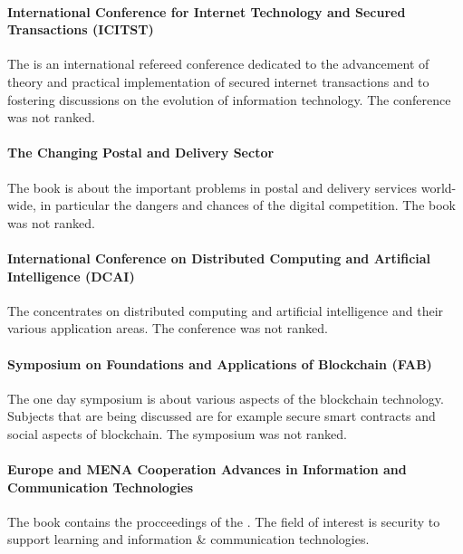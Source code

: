 \paragraph{International Conference for Internet Technology and Secured Transactions (ICITST)} The  is an international refereed conference dedicated to the advancement of theory and practical implementation of secured internet transactions and to fostering discussions on the evolution of information technology. The conference was not ranked.
\paragraph{The Changing Postal and Delivery Sector} The book  is about the important problems in postal and delivery services world-wide, in particular the dangers and chances of the digital competition. The book was not ranked.
\paragraph{International Conference on Distributed Computing and Artificial Intelligence (DCAI)} The  concentrates on distributed computing and artificial intelligence and their various application areas. The conference was not ranked.
\paragraph{Symposium on Foundations and Applications of Blockchain (FAB)} The one day symposium  is about various aspects of the blockchain technology. Subjects that are being discussed are for example secure smart contracts and social aspects of blockchain. The symposium was not ranked.
\paragraph{Europe and MENA Cooperation Advances in Information and Communication Technologies} The book contains the procceedings of the . The field of interest is security to support learning and information \& communication technologies.
